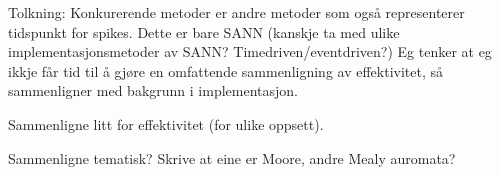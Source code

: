 \documentclass[a4paper,11 pt]{report}
\begin{document}
Tolkning:
Konkurerende metoder er andre metoder som også representerer tidspunkt for spikes. Dette er bare SANN (kanskje ta med ulike implementasjonsmetoder av SANN? Timedriven/eventdriven?)
Eg tenker at eg ikkje får tid til å gjøre en omfattende sammenligning av effektivitet, så sammenligner med bakgrunn i implementasjon. 

Sammenligne litt for effektivitet (for ulike oppsett).

Sammenligne tematisk? Skrive at eine er Moore, andre Mealy auromata?


\tableofcontents



















\end{document}
